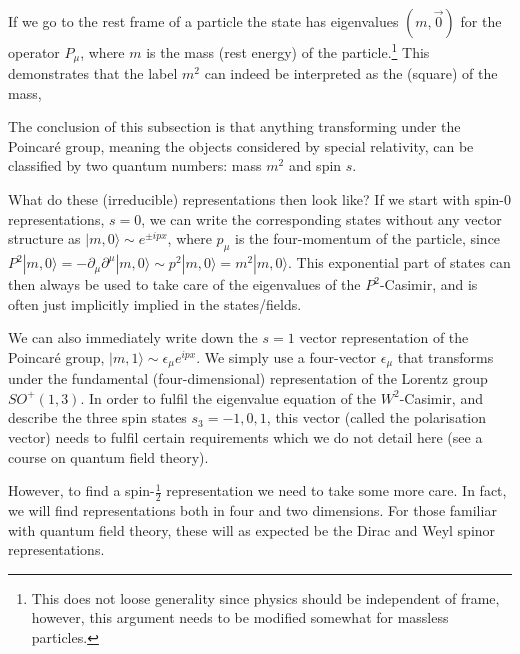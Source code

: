 \documentclass[notes.tex]{subfiles}
\begin{document}
If we go to the rest frame of a particle the state has eigenvalues $(m, \vec{0})$ for the operator $P_\mu$, where $m$ is the mass (rest energy) of the particle.\footnote{This does not loose generality since physics should be independent of frame, however, this argument needs to be modified somewhat for massless particles.} This demonstrates that the label $m^2$ can indeed be interpreted as the (square) of the mass,



The conclusion of this subsection is that anything transforming under the Poincaré group, meaning the objects considered by special relativity, can be classified by two quantum numbers: mass $m^2$ and spin $s$.

What do these (irreducible) representations then look like? If we start with spin-0 representations, $s=0$, we can write the corresponding states without any vector structure as $|m,0\rangle\sim e^{\pm ipx}$, where $p_\mu$ is the four-momentum of the particle, since $P^2|m,0\rangle=-\partial_\mu\partial^\mu|m,0\rangle\sim p^2|m,0\rangle=m^2|m,0\rangle$. This exponential part of states can then always be used to take care of the eigenvalues of the $P^2$-Casimir, and is often just implicitly implied in the states/fields.

We can also immediately write down the $s=1$ vector representation of the Poincaré group, $|m,1\rangle\sim\epsilon_\mu e^{ipx}$. We simply use a four-vector $\epsilon_\mu$ that transforms under the fundamental (four-dimensional) representation of the Lorentz group $SO^+(1,3)$. In order to fulfil the eigenvalue equation of the $W^2$-Casimir, and describe the three spin states $s_3=-1,0,1$, this vector (called the polarisation vector) needs to fulfil certain requirements which we do not detail here (see a course on quantum field theory).

However, to find a spin-$\frac{1}{2}$ representation we need to take some more care. 
In fact, we will find representations both in four and two dimensions. For those familiar with quantum field theory, these will as expected be the Dirac and Weyl spinor representations.



\end{document}
